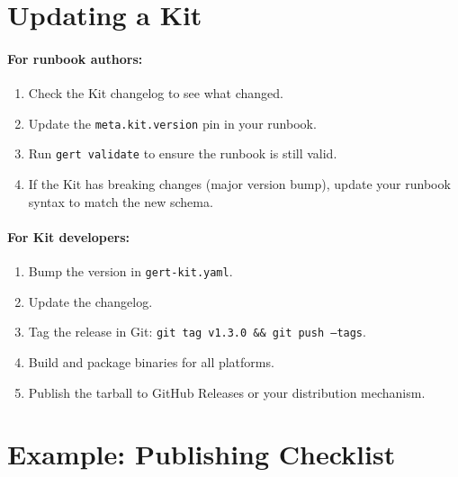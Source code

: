 \section{Updating a Kit}
\label{sec:updating-kit}

\paragraph{For runbook authors:}

\begin{enumerate}
  \item Check the Kit changelog to see what changed.
  \item Update the \texttt{meta.kit.version} pin in your runbook.
  \item Run \texttt{gert validate} to ensure the runbook is still valid.
  \item If the Kit has breaking changes (major version bump), update your
    runbook syntax to match the new schema.
\end{enumerate}

\paragraph{For Kit developers:}

\begin{enumerate}
  \item Bump the version in \texttt{gert-kit.yaml}.
  \item Update the changelog.
  \item Tag the release in Git: \texttt{git tag v1.3.0 \&\& git push --tags}.
  \item Build and package binaries for all platforms.
  \item Publish the tarball to GitHub Releases or your distribution mechanism.
\end{enumerate}

\section{Example: Publishing Checklist}
\label{sec:publishing-checklist}

